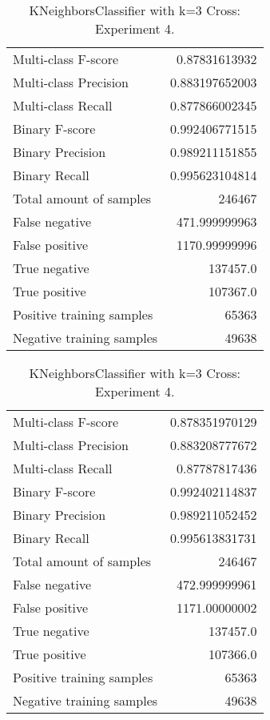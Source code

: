 \begin{table}[H]
\begin{minipage}{0.5\textwidth}
\caption{KNeighborsClassifier with k=3 Cross: Experiment 3.}
\centering
\begin{tabular}{l r}
\toprule
Multi-class F-score & 0.87831613932 \\
Multi-class Precision & 0.883197652003 \\
Multi-class Recall & 0.877866002345 \\
\midrule
Binary F-score & 0.992406771515 \\
Binary Precision & 0.989211151855 \\
Binary Recall & 0.995623104814 \\
\midrule
Total amount of samples & 246467 \\
False negative & 471.999999963 \\
False positive & 1170.99999996 \\
True negative & 137457.0 \\
True positive & 107367.0 \\
\midrule
Positive training samples & 65363 \\
Negative training samples & 49638 \\
\bottomrule
\end{tabular}
\end{minipage}
\hfillx
\begin{minipage}{0.5\textwidth}
\caption{KNeighborsClassifier with k=3 Cross: Experiment 4.}
\centering
\begin{tabular}{l r}
\toprule
Multi-class F-score & 0.878351970129 \\
Multi-class Precision & 0.883208777672 \\
Multi-class Recall & 0.87787817436 \\
\midrule
Binary F-score & 0.992402114837 \\
Binary Precision & 0.989211052452 \\
Binary Recall & 0.995613831731 \\
\midrule
Total amount of samples & 246467 \\
False negative & 472.999999961 \\
False positive & 1171.00000002 \\
True negative & 137457.0 \\
True positive & 107366.0 \\
\midrule
Positive training samples & 65363 \\
Negative training samples & 49638 \\
\bottomrule
\end{tabular}
\end{minipage}
\end{table}
